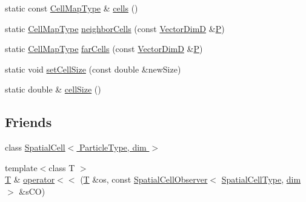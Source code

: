 \begin{DoxyCompactItemize}
static const \hyperlink{structmodel_1_1_spatial_cell_observer_a3ee3ac7a68725cbe49ef4ae951ce2231}{Cell\+Map\+Type} \& \hyperlink{structmodel_1_1_spatial_cell_observer_ac7692bd99745722f232eb60390ae1781}{cells} ()
\item 
static \hyperlink{structmodel_1_1_spatial_cell_observer_a3ee3ac7a68725cbe49ef4ae951ce2231}{Cell\+Map\+Type} \hyperlink{structmodel_1_1_spatial_cell_observer_a0be8d72211607d9222e246bb9eebfc5b}{neighbor\+Cells} (const \hyperlink{structmodel_1_1_spatial_cell_observer_a9b73220477f451fa7981e2597f23614b}{Vector\+Dim\+D} \&\hyperlink{_f_e_m_2linear__elasticity__3d_2tetgen_2generate_p_o_l_ycube_8m_a50a9afb44201a65ab7ad5feb2150aeb6}{P})
\item 
static \hyperlink{structmodel_1_1_spatial_cell_observer_a3ee3ac7a68725cbe49ef4ae951ce2231}{Cell\+Map\+Type} \hyperlink{structmodel_1_1_spatial_cell_observer_a3b9504aca66c19b9310dc0896b591060}{far\+Cells} (const \hyperlink{structmodel_1_1_spatial_cell_observer_a9b73220477f451fa7981e2597f23614b}{Vector\+Dim\+D} \&\hyperlink{_f_e_m_2linear__elasticity__3d_2tetgen_2generate_p_o_l_ycube_8m_a50a9afb44201a65ab7ad5feb2150aeb6}{P})
\item 
static void \hyperlink{structmodel_1_1_spatial_cell_observer_a9ccaa459c78b396ffe02232d6c4111af}{set\+Cell\+Size} (const double \&new\+Size)
\item 
static double \& \hyperlink{structmodel_1_1_spatial_cell_observer_a47cfd8f7c648bf38a27dc55409c8bef5}{cell\+Size} ()
\end{DoxyCompactItemize}
\subsection*{Friends}
\begin{DoxyCompactItemize}
\item 
class \hyperlink{structmodel_1_1_spatial_cell_observer_a66a2fc25a4a56a7f37b3f0f90b386e03}{Spatial\+Cell$<$ Particle\+Type, dim $>$}
\item 
{\footnotesize template$<$class T $>$ }\\\hyperlink{_spline_node_base__corder1_8h_a82692d3a5502b91460591f1d5504314a}{T} \& \hyperlink{structmodel_1_1_spatial_cell_observer_a96e877e3c58ac16c3cdf8114bbbc7aa2}{operator$<$$<$} (\hyperlink{_spline_node_base__corder1_8h_a82692d3a5502b91460591f1d5504314a}{T} \&os, const \hyperlink{structmodel_1_1_spatial_cell_observer}{Spatial\+Cell\+Observer}$<$ \hyperlink{structmodel_1_1_spatial_cell_observer_a276f0ef902c63265b8236fb591d8a1f9}{Spatial\+Cell\+Type}, \hyperlink{plot_nd_a_8m_a382f3ca768b275b8d563604f7fc7df73}{dim} $>$ \&s\+C\+O)
\end{DoxyCompactItemize}


